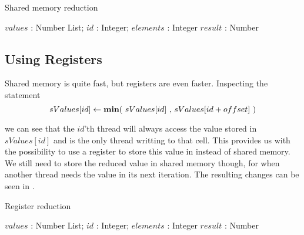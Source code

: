 \begin{algorithm}
  \caption{Shared memory reduction}
  \label{alg:sharedReduct}
  \begin{algorithmic}
              {$values$ : Number List; $id$ : Integer; $elements$ : Integer}
              {$result$ : Number}
              {
                \SYNC
                  \ENDIF
                  \SYNC
                \ENDWHILE
                \ENDIF
              }
  \end{algorithmic}
\end{algorithm}

\subsection{Using Registers}

Shared memory is quite fast, but registers are even faster. Inspecting
the statement 
\begin{displaymath}
  sValues[id] \leftarrow \text{\textbf{min}$($ $sValues[id]$ , $sValues[id + offset]$ $)$}
\end{displaymath}

we can see that the $id$'th thread will always access the value stored in
$sValues[id]$ and is the only thread writting to that cell. This provides us
with the possibility to use a register to store this value in instead of shared
memory. We still need to store the reduced value in shared memory though, for
when another thread needs the value in its next iteration. The resulting changes
can be seen in .

\begin{algorithm}
  \caption{Register reduction}
  \label{alg:registerReduct}
  \begin{algorithmic}
              {$values$ : Number List; $id$ : Integer; $elements$ : Integer}
              {$result$ : Number}
              {
                \SYNC
                  \ENDIF
                  \SYNC
                \ENDWHILE
                \ENDIF
              }
  \end{algorithmic}
\end{algorithm}



